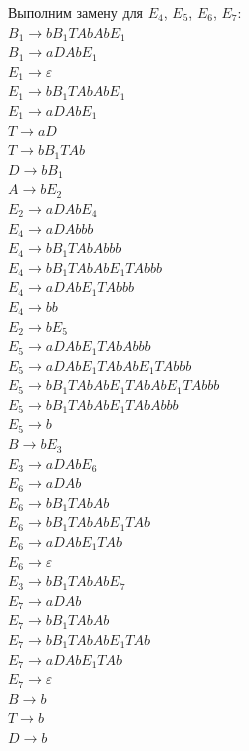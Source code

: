 \documentclass[a4paper,14pt]{extarticle}
\begin{document}
\begin{enumerate}[1.]
Выполним замену для $E_4$, $E_5$, $E_6$, $E_7$:\\
$B_1 \rightarrow bB_1TAbAbE_1$\\
$B_1 \rightarrow aDAbE_1$\\
$E_1 \rightarrow \varepsilon$\\
$E_1 \rightarrow bB_1TAbAbE_1$\\
$E_1 \rightarrow aDAbE_1$\\
$T \rightarrow aD$\\ 
$T \rightarrow bB_1TAb$\\
$D \rightarrow bB_1$\\
$A \rightarrow bE_2$\\
$E_2 \rightarrow aDAbE_4$\\
$E_4 \rightarrow aDAbbb$\\
$E_4 \rightarrow bB_1TAbAbbb$\\
$E_4 \rightarrow bB_1TAbAbE_1TAbbb$\\
$E_4 \rightarrow aDAbE_1TAbbb$\\
$E_4 \rightarrow bb$\\
$E_2 \rightarrow bE_5$\\
$E_5 \rightarrow aDAbE_1TAbAbbb$\\
$E_5 \rightarrow aDAbE_1TAbAbE_1TAbbb$\\
$E_5 \rightarrow bB_1TAbAbE_1TAbAbE_1TAbbb$\\
$E_5 \rightarrow bB_1TAbAbE_1TAbAbbb$\\
$E_5 \rightarrow b$\\
$B \rightarrow bE_3$\\ 
$E_3 \rightarrow aDAbE_6$\\
$E_6 \rightarrow aDAb$\\ 
$E_6 \rightarrow bB_1TAbAb$\\ 
$E_6 \rightarrow bB_1TAbAbE_1TAb$\\ 
$E_6 \rightarrow aDAbE_1TAb$\\ 
$E_6 \rightarrow \varepsilon$\\ 
$E_3 \rightarrow bB_1TAbAbE_7$\\
$E_7 \rightarrow aDAb$\\
$E_7 \rightarrow bB_1TAbAb$\\
$E_7 \rightarrow bB_1TAbAbE_1TAb$\\
$E_7 \rightarrow aDAbE_1TAb$\\
$E_7 \rightarrow \varepsilon$\\
$B \rightarrow b$\\
$T \rightarrow b$\\
$D \rightarrow b$\\


\end{enumerate}
\end{document}

